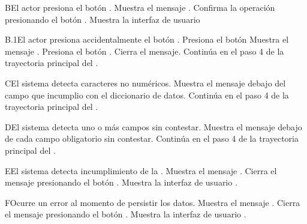 \begin{UCtrayectoriaA}{B}{El actor presiona el botón .}
	\UCpaso Muestra el mensaje .
	\UCpaso[\UCactor] Confirma la operación presionando el botón .
	\UCpaso Muestra la interfaz de usuario 
\end{UCtrayectoriaA}

\begin{UCtrayectoriaA}{B.1}{El actor presiona accidentalmente el botón .}
	\UCpaso[\UCactor] Presiona el botón 
	\UCpaso Muestra el mensaje .
	\UCpaso[\UCactor] Presiona el botón .
	\UCpaso Cierra el mensaje.
	\UCpaso Continúa en el paso 4 de la trayectoria principal del .
\end{UCtrayectoriaA}

\begin{UCtrayectoriaA}{C}{El sistema detecta caracteres no numéricos.}
	\UCpaso Muestra el mensaje  debajo del campo que incumplio con el diccionario de datos.
	\UCpaso Continúa en el paso 4 de la trayectoria principal del .
\end{UCtrayectoriaA}
\begin{UCtrayectoriaA}{D}{El sistema detecta uno o más campos sin contestar.}
	\UCpaso Muestra el mensaje  debajo de cada campo obligatorio sin contestar.
	\UCpaso Continúa en el paso 4 de la trayectoria principal del .
\end{UCtrayectoriaA}

\begin{UCtrayectoriaA}{E}{El sistema detecta incumplimiento de la  .}
	\UCpaso Muestra el mensaje .
	\UCpaso[\UCactor] Cierra el mensaje presionando el botón .
	\UCpaso Muestra la interfaz de usuario .
\end{UCtrayectoriaA}

\begin{UCtrayectoriaA}{F}{Ocurre un error al momento de persistir los datos.}
	\UCpaso Muestra el mensaje .
	\UCpaso[\UCactor] Cierra el mensaje presionando el botón .
	\UCpaso Muestra la interfaz de usuario .
\end{UCtrayectoriaA}


